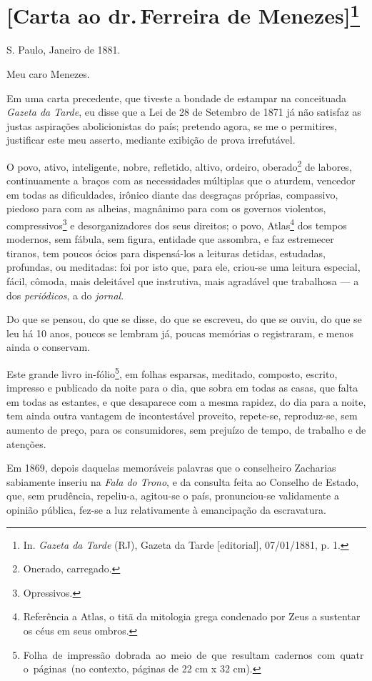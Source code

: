 \chapter{{[}Carta ao dr.\,Ferreira de Menezes{]}\footnote[*]{In.
  \emph{Gazeta da Tarde} (RJ), Gazeta da Tarde {[}editorial{]},
  07/01/1881, p. 1.}}

S. Paulo, Janeiro de 1881.

Meu caro Menezes.

Em uma carta precedente, que tiveste a bondade de estampar na
conceituada \emph{Gazeta da Tarde}, eu disse que a Lei de 28 de Setembro
de 1871 já não satisfaz as justas aspirações abolicionistas do país;
pretendo agora, se me o permitires, justificar este meu asserto,
mediante exibição de prova irrefutável.

O povo, ativo, inteligente, nobre, refletido, altivo, ordeiro,
oberado\footnote{Onerado, carregado.} de labores, continuamente a
braços com as necessidades múltiplas que o aturdem, vencedor em todas as
dificuldades, irônico diante das desgraças próprias, compassivo, piedoso
para com as alheias, magnânimo para com os governos violentos,
compressivos\footnote{Opressivos.} e desorganizadores dos seus
direitos; o povo, Atlas\footnote{Referência a Atlas, o titã da
  mitologia grega condenado por Zeus a sustentar os céus em seus ombros.}
dos tempos modernos, sem fábula, sem figura, entidade que assombra, e
faz estremecer tiranos, tem poucos ócios para dispensá-los a leituras
detidas, estudadas, profundas, ou meditadas: foi por isto que, para ele,
criou-se uma leitura especial, fácil, cômoda, mais deleitável que
instrutiva, mais agradável que trabalhosa --- a dos \emph{periódicos},
a do \emph{jornal}.

Do que se pensou, do que se disse, do que se escreveu, do que se ouviu,
do que se leu há 10 anos, poucos se lembram já, poucas memórias o
registraram, e menos ainda o conservam.

Este grande livro in-fólio\footnote{
  Folha~de~impressão~dobrada~ao~meio~de~que~resultam~cadernos~com~quatro~páginas~(no
  contexto, páginas de 22 cm x 32 cm).}, em folhas esparsas, meditado,
composto, escrito, impresso e publicado da noite para o dia, que sobra
em todas as casas, que falta em todas as estantes, e que desaparece com
a mesma rapidez, do dia para a noite, tem ainda outra vantagem de
incontestável proveito, repete-se, reproduz-se, sem aumento de preço,
para os consumidores, sem prejuízo de tempo, de trabalho e de atenções.

Em 1869, depois daquelas memoráveis palavras que o conselheiro Zacharias
sabiamente inseriu na \emph{Fala do Trono}, e da consulta feita ao
Conselho de Estado, que, sem prudência, repeliu-a, agitou-se o país,
pronunciou-se validamente a opinião pública, fez-se a luz relativamente
à emancipação da escravatura.

